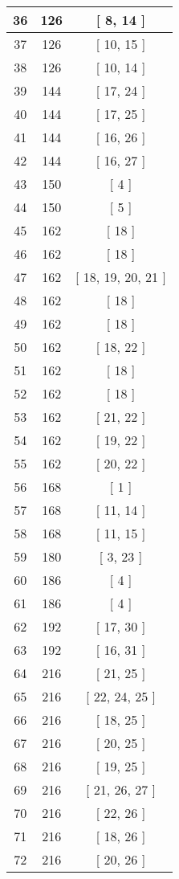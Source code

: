 \begin{center}
\begin{longtable}[H]{|| c c c ||}
36 & 126 & [ 8, 14 ] \\ 
\hline
37 & 126 & [ 10, 15 ] \\ 
\hline
38 & 126 & [ 10, 14 ] \\ 
\hline
39 & 144 & [ 17, 24 ] \\ 
\hline
40 & 144 & [ 17, 25 ] \\ 
\hline
41 & 144 & [ 16, 26 ] \\ 
\hline
42 & 144 & [ 16, 27 ] \\ 
\hline
43 & 150 & [ 4 ] \\ 
\hline
44 & 150 & [ 5 ] \\ 
\hline
45 & 162 & [ 18 ] \\ 
\hline
46 & 162 & [ 18 ] \\ 
\hline
47 & 162 & [ 18, 19, 20, 21 ] \\ 
\hline
48 & 162 & [ 18 ] \\ 
\hline
49 & 162 & [ 18 ] \\ 
\hline
50 & 162 & [ 18, 22 ] \\ 
\hline
51 & 162 & [ 18 ] \\ 
\hline
52 & 162 & [ 18 ] \\ 
\hline
53 & 162 & [ 21, 22 ] \\ 
\hline
54 & 162 & [ 19, 22 ] \\ 
\hline
55 & 162 & [ 20, 22 ] \\ 
\hline
56 & 168 & [ 1 ] \\ 
\hline
57 & 168 & [ 11, 14 ] \\ 
\hline
58 & 168 & [ 11, 15 ] \\ 
\hline
59 & 180 & [ 3, 23 ] \\ 
\hline
60 & 186 & [ 4 ] \\ 
\hline
61 & 186 & [ 4 ] \\ 
\hline
62 & 192 & [ 17, 30 ] \\ 
\hline
63 & 192 & [ 16, 31 ] \\ 
\hline
64 & 216 & [ 21, 25 ] \\ 
\hline
65 & 216 & [ 22, 24, 25 ] \\ 
\hline
66 & 216 & [ 18, 25 ] \\ 
\hline
67 & 216 & [ 20, 25 ] \\ 
\hline
68 & 216 & [ 19, 25 ] \\ 
\hline
69 & 216 & [ 21, 26, 27 ] \\ 
\hline
70 & 216 & [ 22, 26 ] \\ 
\hline
71 & 216 & [ 18, 26 ] \\ 
\hline
72 & 216 & [ 20, 26 ] \\ 

\end{longtable}
\end{center}

